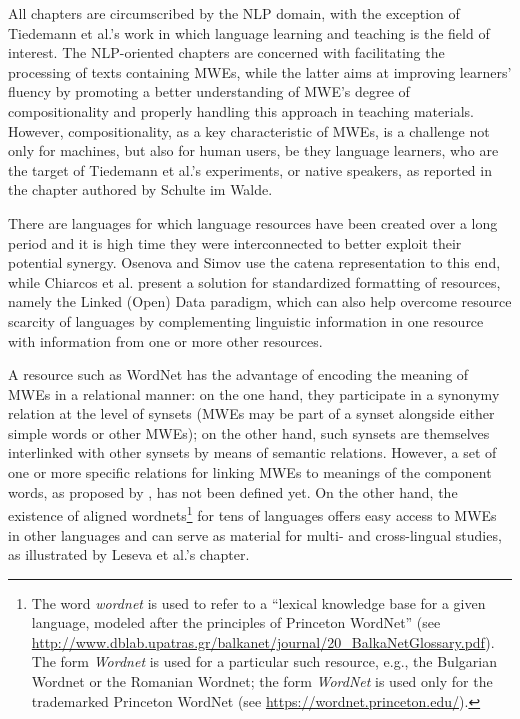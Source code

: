 \begin{refsection}
All chapters are circumscribed by the NLP domain, with the exception of Tiedemann et al.'s work in which language learning and teaching is the field of interest. The NLP-oriented chapters are concerned with facilitating the processing of texts containing MWEs, while the latter aims at improving learners' fluency by promoting a better understanding of MWE's degree of compositionality and properly handling this approach in teaching materials. However, compositionality, as a key characteristic of MWEs, is a challenge not only for machines, but also for human users, be they language learners, who are the target of Tiedemann et al.'s experiments, or native speakers, as reported in the chapter authored by Schulte im Walde.

There are languages for which language resources have been created over a long period and it is high time they were interconnected to better exploit their potential synergy. Osenova and Simov use the catena representation to this end, while Chiarcos et al. present a solution for standardized formatting of resources, namely the Linked (Open) Data paradigm, which can also help overcome resource scarcity of languages by complementing linguistic information in one resource with information from one or more other resources.


A resource such as WordNet \citep{miller,Fellbaum:98} has the advantage of encoding the meaning of MWEs in a relational manner: on the one hand, they participate in a synonymy relation at the level of synsets (MWEs may be part of a synset alongside either simple words or other MWEs); on the other hand, such synsets are themselves interlinked with other synsets by means of semantic relations. However, a set of one or more specific relations for linking MWEs to meanings of the component words, as proposed by \citet{Osherson2010}, has not been defined yet. On the other hand, the existence of aligned wordnets\footnote{The word \textit{wordnet} is used to refer to a ``lexical knowledge base for a given language, modeled after the principles of Princeton WordNet'' (see \url{http://www.dblab.upatras.gr/balkanet/journal/20_BalkaNetGlossary.pdf}). The form \textit{Wordnet} is used for a particular such resource, e.g., the Bulgarian Wordnet or the Romanian Wordnet; the form \textit{WordNet} is used only for the trademarked Princeton WordNet (see \url{https://wordnet.princeton.edu/}).} for tens of languages offers easy access to MWEs in other languages and can serve as material for multi- and cross-lingual studies, as illustrated by Leseva et al.'s chapter.


\end{refsection}
